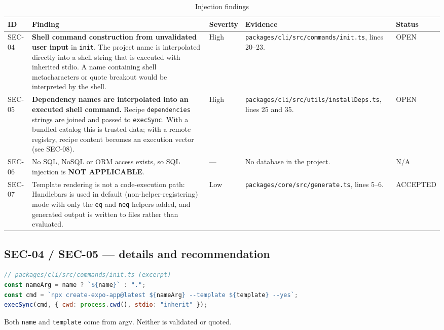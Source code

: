 \begin{longtable}{p{1.3cm}p{3.6cm}p{1.9cm}p{5.8cm}p{1.6cm}}
\caption{Injection findings}\\
\toprule
\textbf{ID} & \textbf{Finding} & \textbf{Severity} & \textbf{Evidence} & \textbf{Status} \\
\midrule

SEC-04 & \textbf{Shell command construction from unvalidated user input} in
\texttt{init}. The project name is interpolated directly into a shell string that
is executed with inherited stdio. A name containing shell metacharacters or quote
breakout would be interpreted by the shell. & High &
\texttt{packages/cli/src/commands/init.ts}, lines 20--23. & OPEN \\
SEC-05 & \textbf{Dependency names are interpolated into an executed shell
command.} Recipe \texttt{dependencies} strings are joined and passed to
\texttt{execSync}. With a bundled catalog this is trusted data; with a remote
registry, recipe content becomes an execution vector (see SEC-08). & High &
\texttt{packages/cli/src/utils/installDeps.ts}, lines 25 and 35. & OPEN \\
SEC-06 & No SQL, NoSQL or ORM access exists, so SQL injection is
\textbf{NOT APPLICABLE}. & --- & No database in the project. & N/A \\
SEC-07 & Template rendering is not a code-execution path: Handlebars is used in
default (non-helper-registering) mode with only the \texttt{eq} and \texttt{neq}
helpers added, and generated output is written to files rather than evaluated. & Low &
\texttt{packages/core/src/generate.ts}, lines 5--6. & ACCEPTED \\
\bottomrule
\end{longtable}

\subsection*{SEC-04 / SEC-05 --- details and recommendation}

\begin{lstlisting}[language=JavaScript]
// packages/cli/src/commands/init.ts (excerpt)
const nameArg = name ? `${name}` : ".";
const cmd = `npx create-expo-app@latest ${nameArg} --template ${template} --yes`;
execSync(cmd, { cwd: process.cwd(), stdio: "inherit" });
\end{lstlisting}

Both \texttt{name} and \texttt{template} come from argv. Neither is validated or
quoted.

